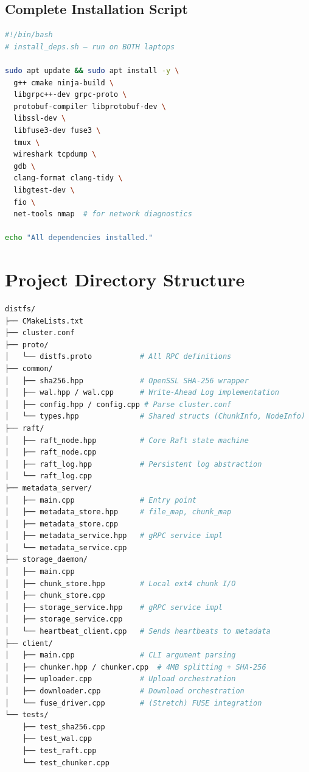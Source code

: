 \documentclass[12pt,a4paper]{article}
\begin{document}
\subsection{Complete Installation Script}

\begin{lstlisting}[language=bash, caption={One-shot dependency install (Ubuntu/Debian)}]
#!/bin/bash
# install_deps.sh — run on BOTH laptops

sudo apt update && sudo apt install -y \
  g++ cmake ninja-build \
  libgrpc++-dev grpc-proto \
  protobuf-compiler libprotobuf-dev \
  libssl-dev \
  libfuse3-dev fuse3 \
  tmux \
  wireshark tcpdump \
  gdb \
  clang-format clang-tidy \
  libgtest-dev \
  fio \
  net-tools nmap  # for network diagnostics

echo "All dependencies installed."
\end{lstlisting}

\section{Project Directory Structure}

\begin{lstlisting}[language=bash, caption={Recommended source tree}]
distfs/
├── CMakeLists.txt
├── cluster.conf
├── proto/
│   └── distfs.proto           # All RPC definitions
├── common/
│   ├── sha256.hpp             # OpenSSL SHA-256 wrapper
│   ├── wal.hpp / wal.cpp      # Write-Ahead Log implementation
│   ├── config.hpp / config.cpp # Parse cluster.conf
│   └── types.hpp              # Shared structs (ChunkInfo, NodeInfo)
├── raft/
│   ├── raft_node.hpp          # Core Raft state machine
│   ├── raft_node.cpp
│   ├── raft_log.hpp           # Persistent log abstraction
│   └── raft_log.cpp
├── metadata_server/
│   ├── main.cpp               # Entry point
│   ├── metadata_store.hpp     # file_map, chunk_map
│   ├── metadata_store.cpp
│   ├── metadata_service.hpp   # gRPC service impl
│   └── metadata_service.cpp
├── storage_daemon/
│   ├── main.cpp
│   ├── chunk_store.hpp        # Local ext4 chunk I/O
│   ├── chunk_store.cpp
│   ├── storage_service.hpp    # gRPC service impl
│   ├── storage_service.cpp
│   └── heartbeat_client.cpp   # Sends heartbeats to metadata
├── client/
│   ├── main.cpp               # CLI argument parsing
│   ├── chunker.hpp / chunker.cpp  # 4MB splitting + SHA-256
│   ├── uploader.cpp           # Upload orchestration
│   ├── downloader.cpp         # Download orchestration
│   └── fuse_driver.cpp        # (Stretch) FUSE integration
└── tests/
    ├── test_sha256.cpp
    ├── test_wal.cpp
    ├── test_raft.cpp
    └── test_chunker.cpp
\end{lstlisting}
\end{document}
